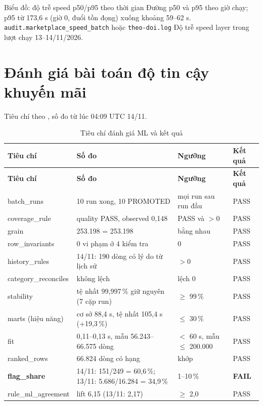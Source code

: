   {Biểu đồ: độ trễ speed p50/p95 theo thời gian}
  {Đường p50 và p95 theo giờ chạy; p95 từ 173,6 s (giờ 0, đuổi tồn đọng) xuống khoảng 59--62 s.}
  {\texttt{audit.marketplace\_speed\_batch} hoặc \texttt{theo-doi.log}}
  {Độ trễ speed layer trong lượt chạy 13--14/11/2026.}

\section{Đánh giá bài toán độ tin cậy khuyến mãi}
Tiêu chí theo , số đo từ  lúc 04:09 UTC 14/11.

\begin{xltabular}{\linewidth}{@{}L{35mm}Y L{30mm}C{14mm}@{}}
  \caption{Tiêu chí đánh giá ML và kết quả}\label{tab:ml-criteria}\\
  \toprule
  \textbf{Tiêu chí} & \textbf{Số đo} & \textbf{Ngưỡng} & \textbf{Kết quả} \\
  \midrule
  \endfirsthead
  \toprule \textbf{Tiêu chí} & \textbf{Số đo} & \textbf{Ngưỡng} & \textbf{Kết quả} \\ \midrule
  \endhead
  batch\_runs & 10 run xong, 10 PROMOTED & mọi run sau run đầu & PASS \\
  coverage\_rule & quality PASS, observed 0,148 & PASS và $> 0$ & PASS \\
  grain & 253.198 = 253.198 & bằng nhau & PASS \\
  row\_invariants & 0 vi phạm ở 4 kiểm tra & 0 & PASS \\
  history\_rules & 14/11: 190 dòng có lý do từ lịch sử & $> 0$ & PASS \\
  category\_reconciles & không lệch & lệch 0 & PASS \\
  stability & tệ nhất 99,997\,\% giữ nguyên (7 cặp run) & $\ge$ 99\,\% & PASS \\
  marts (hiệu năng) & cơ sở 88,4 s, tệ nhất 105,4 s (+19,3\,\%) & $\le$ 30\,\% & PASS \\
  fit & 0,11--0,13 s, mẫu 56.243--66.575 dòng & $<$ 60 s, mẫu $\le$ 200.000 & PASS \\
  ranked\_rows & 66.824 dòng có hạng & khớp & PASS \\
  \textbf{flag\_share} & 14/11: 151/249 = 60,6\,\%; 13/11: 5.686/16.284 = 34,9\,\% & 1--10\,\% & \textbf{FAIL} \\
  rule\_ml\_agreement & lift 6,15 (13/11: 2,17) & $\ge$ 2,0 & PASS \\
  \bottomrule
\end{xltabular}

